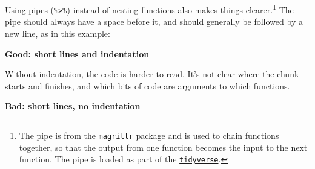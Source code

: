 \documentclass[]{book}
\newenvironment{Shaded}{\begin{snugshade}}{\end{snugshade}}
\newcommand{\DataTypeTok}[1]{\textcolor[rgb]{0.13,0.29,0.53}{#1}}
\newcommand{\DecValTok}[1]{\textcolor[rgb]{0.00,0.00,0.81}{#1}}
\newcommand{\KeywordTok}[1]{\textcolor[rgb]{0.13,0.29,0.53}{\textbf{#1}}}
\newcommand{\NormalTok}[1]{#1}
\newcommand{\OperatorTok}[1]{\textcolor[rgb]{0.81,0.36,0.00}{\textbf{#1}}}
\newcommand{\OtherTok}[1]{\textcolor[rgb]{0.56,0.35,0.01}{#1}}
\newcommand{\StringTok}[1]{\textcolor[rgb]{0.31,0.60,0.02}{#1}}
\begin{document}
Using pipes (\texttt{\%\textgreater{}\%}) instead of nesting functions also makes things clearer.\footnote{The pipe is from the \texttt{magrittr} package and is used to chain functions together, so that the output from one function becomes the input to the next function. The pipe is loaded as part of the \protect\hyperlink{tidyverse}{\texttt{tidyverse}}.} The pipe should always have a space before it, and should generally be followed by a new line, as in this example:

\textbf{Good: short lines and indentation}

\begin{Shaded}
\end{Shaded}

Without indentation, the code is harder to read. It's not clear where the chunk starts and finishes, and which bits of code are arguments to which functions.

\textbf{Bad: short lines, no indentation}

\begin{Shaded}
\end{Shaded}
\end{document}
